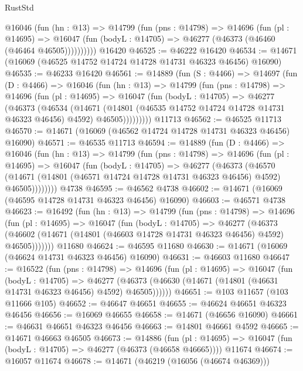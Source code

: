\begin{lexlean}{RustStd}
\begin{coremodule}
        @16046
          (fun (hn : @13) =>
          @14799
            (fun (pns : @14798) =>
            @14696
              (fun (pl : @14695) =>
              @16047 (fun (bodyL : @14705) => @46277 (@46373 (@46460 (@46464 @46505))))))))))
    @16420
@46525 := @46222 @16420
@46534 := @14671 (@16069 (@46525 @14752 @14724 @14728 @14731 @46323 @46456) @16090)
@46535 := @46233 @16420
@46561 := @14889
    (fun (S : @4466) =>
    @14697
      (fun (D : @4466) =>
      @16046
        (fun (hn : @13) =>
        @14799
          (fun (pns : @14798) =>
          @14696
            (fun (pl : @14695) =>
            @16047
              (fun (bodyL : @14705) =>
              @46277
                (@46373
                  (@46534
                    (@14671
                      (@14801 (@46535 @14752 @14724 @14728 @14731 @46323 @46456) @4592)
                      @46505)))))))))
    @11713
@46562 := @46525 @11713
@46570 := @14671 (@16069 (@46562 @14724 @14728 @14731 @46323 @46456) @16090)
@46571 := @46535 @11713
@46594 := @14889
    (fun (D : @4466) =>
    @16046
      (fun (hn : @13) =>
      @14799
        (fun (pns : @14798) =>
        @14696
          (fun (pl : @14695) =>
          @16047
            (fun (bodyL : @14705) =>
            @46277
              (@46373
                (@46570
                  (@14671 (@14801 (@46571 @14724 @14728 @14731 @46323 @46456) @4592) @46505))))))))
    @4738
@46595 := @46562 @4738
@46602 := @14671 (@16069 (@46595 @14728 @14731 @46323 @46456) @16090)
@46603 := @46571 @4738
@46623 := @16492
    (fun (hn : @13) =>
    @14799
      (fun (pns : @14798) =>
      @14696
        (fun (pl : @14695) =>
        @16047
          (fun (bodyL : @14705) =>
          @46277
            (@46373
              (@46602 (@14671 (@14801 (@46603 @14728 @14731 @46323 @46456) @4592) @46505)))))))
    @11680
@46624 := @46595 @11680
@46630 := @14671 (@16069 (@46624 @14731 @46323 @46456) @16090)
@46631 := @46603 @11680
@46647 := @16522
    (fun (pns : @14798) =>
    @14696
      (fun (pl : @14695) =>
      @16047
        (fun (bodyL : @14705) =>
        @46277 (@46373 (@46630 (@14671 (@14801 (@46631 @14731 @46323 @46456) @4592) @46505))))))
@46651 := @103 @11657 (@103 @11666 @105)
@46652 := @46647 @46651
@46655 := @46624 @46651 @46323 @46456
@46656 := @16069 @46655
@46658 := @14671 (@46656 @16090)
@46661 := @46631 @46651 @46323 @46456
@46663 := @14801 @46661 @4592
@46665 := @14671 @46663 @46505
@46673 := @14886
    (fun (pl : @14695) => @16047 (fun (bodyL : @14705) => @46277 (@46373 (@46658 @46665))))
    @11674
@46674 := @16057 @11674
@46678 := @14671 (@46219 (@16056 (@46674 @46369)))

\end{coremodule}
\end{lexlean}
